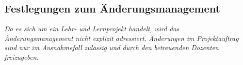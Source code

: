 \subsection{Festlegungen zum Änderungsmanagement}

\textit{
    Da es sich um ein Lehr- und Lernprojekt handelt, wird das Änderungsmanagement nicht explizit adressiert. Änderungen im Projektauftrag sind nur im Ausnahmefall zulässig und durch den betreuenden Dozenten freizugeben.
}

